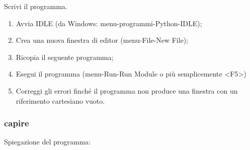 \begin{procedura}
Scrivi il programma.
\begin{enumerate} [noitemsep]
 \item Avvia IDLE (da Windows: menu-programmi-Python-IDLE);
 \item Crea una nuova finestra di editor (menu-File-New File);
 \item Ricopia il seguente programma;
 \item Esegui il programma (menu-Run-Run Module o più semplicemente <F5>)
 \item Correggi gli errori finché il programma non produce una finestra con un 
riferimento cartesiano vuoto.
\end{enumerate}
\end{procedura}



\subsubsection{capire}

Spiegazione del programma:

